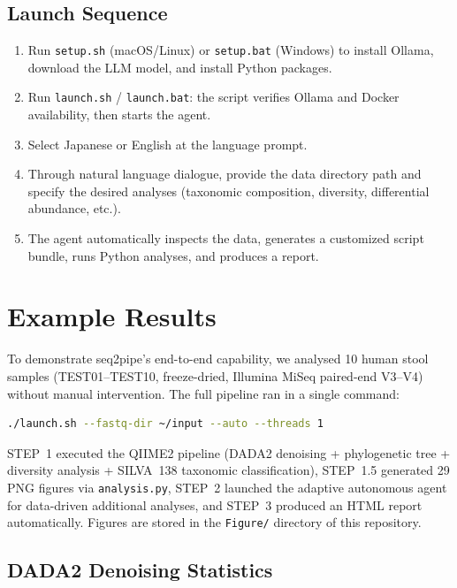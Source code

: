 \documentclass[12pt, a4paper]{article}
\begin{document}
\subsection{Launch Sequence}

\begin{enumerate}[leftmargin=2em]
  \item Run \texttt{setup.sh} (macOS/Linux) or \texttt{setup.bat} (Windows)
    to install Ollama, download the LLM model, and install Python packages.
  \item Run \texttt{launch.sh} / \texttt{launch.bat}: the script verifies
    Ollama and Docker availability, then starts the agent.
  \item Select Japanese or English at the language prompt.
  \item Through natural language dialogue, provide the data directory path
    and specify the desired analyses
    (taxonomic composition, diversity, differential abundance, etc.).
  \item The agent automatically inspects the data, generates a customized
    script bundle, runs Python analyses, and produces a report.
\end{enumerate}

\section{Example Results}

To demonstrate seq2pipe's end-to-end capability, we analysed
10 human stool samples (TEST01--TEST10, freeze-dried, Illumina MiSeq
paired-end V3--V4) without manual intervention.
The full pipeline ran in a single command:

\begin{lstlisting}[language=bash, caption={Fully autonomous analysis with seq2pipe}]
./launch.sh --fastq-dir ~/input --auto --threads 1
\end{lstlisting}

STEP~1 executed the QIIME2 pipeline (DADA2 denoising +
phylogenetic tree + diversity analysis + SILVA~138 taxonomic classification),
STEP~1.5 generated 29 PNG figures via \texttt{analysis.py},
STEP~2 launched the adaptive autonomous agent for data-driven additional analyses, and
STEP~3 produced an HTML report automatically.
Figures are stored in the \texttt{Figure/} directory of this repository.

\subsection{DADA2 Denoising Statistics}
\end{document}
